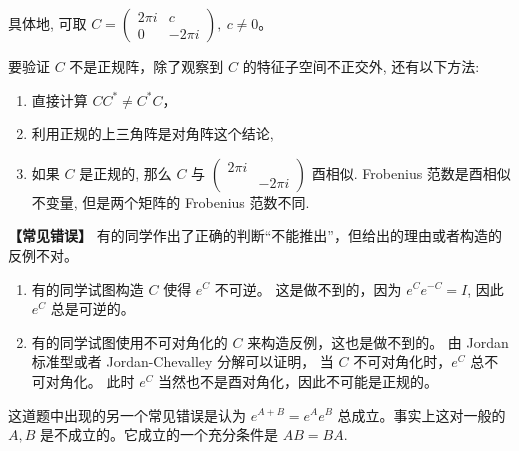 \begin{enumerate}
具体地, 可取 $C=\begin{pmatrix}2\pi i & c\\0 & -2\pi i\end{pmatrix},\ c\neq0$。

要验证 $C$ 不是正规阵，除了观察到 $C$ 的特征子空间不正交外, 还有以下方法:
\begin{enumerate}[label=(\alph*)]
\item 直接计算 $CC^*\neq C^*C$，
\item 利用正规的上三角阵是对角阵这个结论,
\item 如果 $C$ 是正规的, 那么 $C$ 与 $\begin{pmatrix}2\pi i&\\&-2\pi i\end{pmatrix}$ 酉相似. 
Frobenius 范数是酉相似不变量, 但是两个矩阵的 Frobenius 范数不同.
\end{enumerate}

\textbf{【常见错误】} 有的同学作出了正确的判断“不能推出”，但给出的理由或者构造的反例不对。
\begin{enumerate}[label=(\alph*)]
\item 有的同学试图构造 $C$ 使得 $e^C$ 不可逆。
这是做不到的，因为 $e^Ce^{-C}=I$, 因此 $e^C$ 总是可逆的。
\item 有的同学试图使用不可对角化的 $C$ 来构造反例，这也是做不到的。
由 Jordan 标准型或者 Jordan-Chevalley 分解可以证明，
当 $C$ 不可对角化时，$e^C$ 总不可对角化。
此时 $e^C$ 当然也不是酉对角化，因此不可能是正规的。
\end{enumerate}

这道题中出现的另一个常见错误是认为 $e^{A+B}=e^Ae^B$ 总成立。事实上这对一般的 $A,B$ 是不成立的。它成立的一个充分条件是 $AB=BA$.
\end{enumerate}


